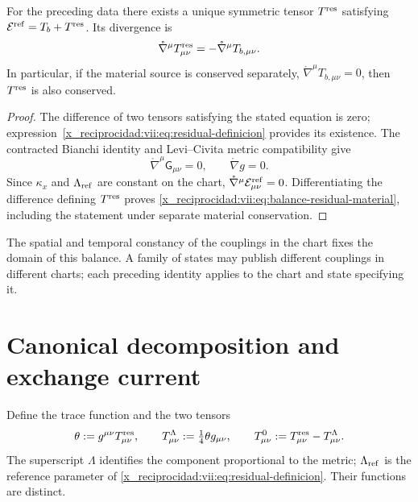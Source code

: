 \begin{theorem}
\label{x_reciprocidad:vii:thm:residual-unicidad-balance}
For the preceding data there exists a unique symmetric tensor
\(T^{\rm res}\) satisfying
\(\mathcal E^{\rm ref}=T_b+T^{\rm res}\). Its divergence is
\begin{equation}
 \mathring\nabla^\mu T^{\rm res}_{\mu\nu}
 =-\mathring\nabla^\mu T_{b,\mu\nu}.
 \label{x_reciprocidad:vii:eq:balance-residual-material}
\end{equation}
In particular, if the material source is conserved separately,
\(\mathring\nabla^\mu T_{b,\mu\nu}=0\), then
\(T^{\rm res}\) is also conserved.
\end{theorem}
\begin{proof}
The difference of two tensors satisfying the stated equation is
zero; expression~\eqref{x_reciprocidad:vii:eq:residual-definicion} provides its
existence. The contracted Bianchi identity and Levi--Civita metric
compatibility give
\[
 \mathring\nabla^\mu\mathsf G_{\mu\nu}=0,
 \qquad \mathring\nabla g=0.
\]
Since \(\kappa_x\) and \(\Lambda_{\rm ref}\) are constant on the
chart, \(\mathring\nabla^\mu\mathcal E^{\rm ref}_{\mu\nu}=0\).
Differentiating the difference defining \(T^{\rm res}\) proves
\eqref{x_reciprocidad:vii:eq:balance-residual-material}, including the statement under
separate material conservation.
\end{proof}

The spatial and temporal constancy of the couplings in the chart fixes
the domain of this balance. A family of states may publish
different couplings in different charts; each preceding identity
applies to the chart and state specifying it.

\section{Canonical decomposition and exchange current}
\label{x_reciprocidad:vii:subsec:traza-corriente-residual}

Define the trace function and the two tensors
\begin{equation}
 \theta:=g^{\mu\nu}T^{\rm res}_{\mu\nu},\qquad
 T^{\Lambda}_{\mu\nu}:=\tfrac14\theta g_{\mu\nu},\qquad
 T^{0}_{\mu\nu}:=T^{\rm res}_{\mu\nu}-T^{\Lambda}_{\mu\nu}.
 \label{x_reciprocidad:vii:eq:descomposicion-traza-residual}
\end{equation}
The superscript \(\Lambda\) identifies the component proportional to the
metric; \(\Lambda_{\rm ref}\) is the reference parameter of
\eqref{x_reciprocidad:vii:eq:residual-definicion}. Their functions are distinct.

